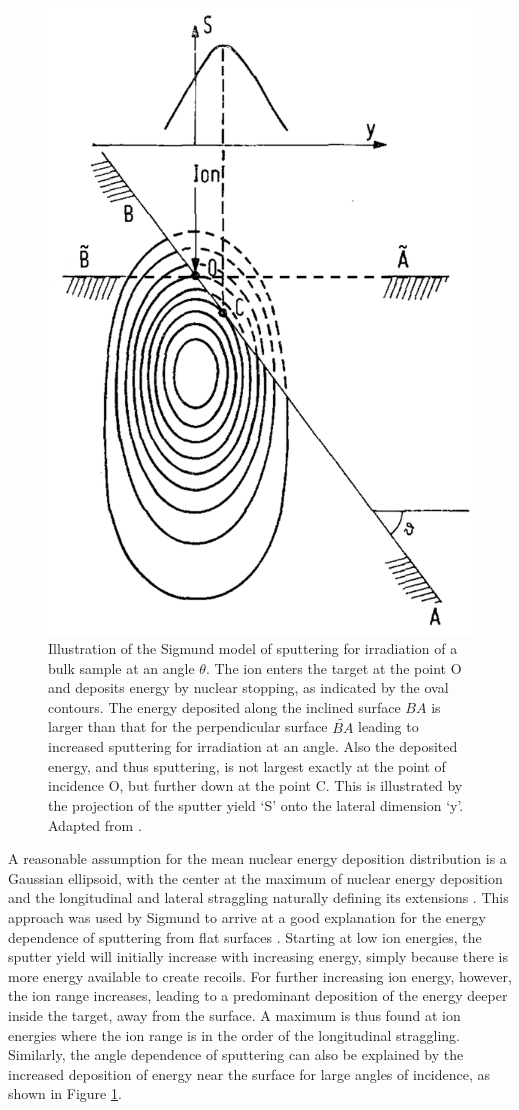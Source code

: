 \begin{figure}
	\centering
		\includegraphics[width=.45\textwidth]{images/anglesigmund.jpg}
	\caption{Illustration of the Sigmund model of sputtering for irradiation of a bulk sample at an angle $\theta$. The ion enters the target at the point O and deposits energy by nuclear stopping, as indicated by the oval contours. The energy deposited along the inclined surface $BA$ is larger than that for the perpendicular surface $\widetilde{BA}$ leading to increased sputtering for irradiation at an angle. Also the deposited energy, and thus sputtering, is not largest exactly at the point of incidence O, but further down at the point C. This is illustrated by the projection of the sputter yield `S' onto the lateral dimension `y'. Adapted from \cite{sigmund_mechanism_1973}.}
	\label{anglesigmund}
\end{figure} 


A reasonable assumption for the mean nuclear energy deposition distribution is a Gaussian ellipsoid, with the center at the maximum of nuclear energy deposition and the longitudinal and lateral straggling naturally defining its extensions \cite{bobes_ion_2012}. This approach was used by Sigmund to arrive at a good explanation for the energy dependence of sputtering from flat surfaces \cite{sigmund_theory_1969}. Starting at low ion energies, the sputter yield will initially increase with increasing energy, simply because there is more energy available to create recoils. For further increasing ion energy, however, the ion range increases, leading to a predominant deposition of the energy deeper inside the target, away from the surface. A maximum is thus found at ion energies where the ion range is in the order of the longitudinal straggling. Similarly, the angle dependence of sputtering can also be explained by the increased deposition of energy near the surface for large angles of incidence, as shown in Figure \ref{anglesigmund}.


